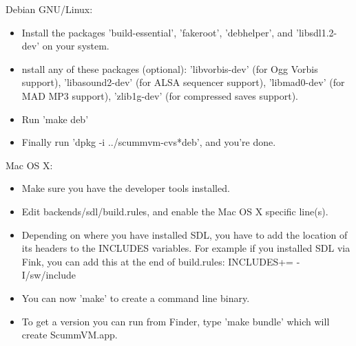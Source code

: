 Debian GNU/Linux:
  \begin{itemize}
  \item Install the packages 'build-essential', 'fakeroot', 'debhelper',
          and 'libsdl1.2-dev' on your system.
  \item nstall any of these packages (optional): 'libvorbis-dev' (for Ogg
          Vorbis support), 'libasound2-dev' (for ALSA sequencer support),
          'libmad0-dev' (for MAD MP3 support), 'zlib1g-dev' (for compressed
          saves support).
  \item Run 'make deb'
  \item Finally run 'dpkg -i ../scummvm-cvs*deb', and you're done.
  \end{itemize}
Mac OS X:
\begin{itemize}
\item Make sure you have the developer tools installed.
\item Edit backends/sdl/build.rules, and enable the Mac OS X specific 
      line(s).
\item Depending on where you have installed SDL, you have to add the
      location of its headers to the INCLUDES variables. For example if you
      installed SDL via Fink, you can add this at the end of build.rules:
      INCLUDES+= -I/sw/include
\item You can now 'make' to create a command line binary.
\item To get a version you can run from Finder, type 'make bundle' which
      will create ScummVM.app.
\end{itemize}